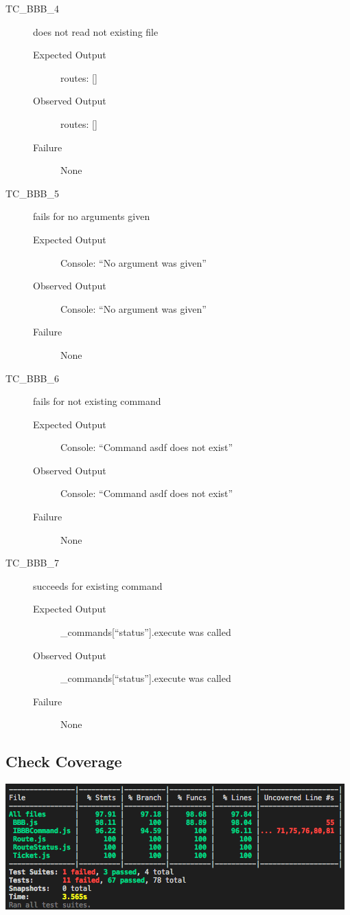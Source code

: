 \documentclass[11pt]{article}
\begin{document}
\begin{description}
\item[{TC\_BBB\_4}] does not read not existing file
\begin{description}
\item[{Expected Output}] routes: []
\item[{Observed Output}] routes: []
\item[{Failure}] None
\end{description}

\item[{TC\_BBB\_5}] fails for no arguments given
\begin{description}
\item[{Expected Output}] Console: “No argument was given”
\item[{Observed Output}] Console: “No argument was given”
\item[{Failure}] None
\end{description}

\item[{TC\_BBB\_6}] fails for not existing command
\begin{description}
\item[{Expected Output}] Console: “Command asdf does not exist”
\item[{Observed Output}] Console: “Command asdf does not exist”
\item[{Failure}] None
\end{description}

\item[{TC\_BBB\_7}] succeeds for existing command
\begin{description}
\item[{Expected Output}] \_commands[“status”].execute was called
\item[{Observed Output}] \_commands[“status”].execute was called
\item[{Failure}] None
\end{description}
\end{description}

\subsection{Check Coverage}
\label{sec:orgf9b924f}

\begin{center}
\includegraphics[width=.9\linewidth]{documentation.org.img/Iteration2_Coverage.png}
\end{center}
\end{document}
